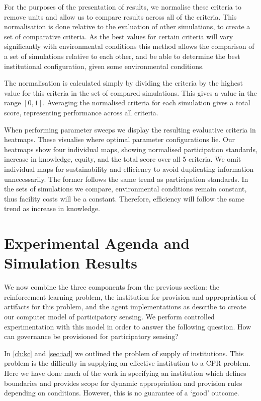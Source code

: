 For the purposes of the presentation of results, we normalise these criteria
to remove units and allow us to compare results across all of the criteria.
This normalisation is done relative to the evaluation of other simulations, to
create a set of comparative criteria. As the best values for certain criteria
will vary significantly with environmental conditions this method allows the
comparison of a set of simulations relative to each other, and be able to
determine the best institutional configuration, given some environmental
conditions.

The normalisation is calculated simply by dividing the criteria by the highest
value for this criteria in the set of compared simulations. This gives a value
in the range $[0,1]$. Averaging the normalised criteria for each simulation
gives a total score, representing performance across all criteria. 

When performing parameter sweeps we display the resulting evaluative criteria
in heatmaps. These visualise where optimal parameter configurations lie. Our
heatmaps show four individual maps, showing normalised participation
standards, increase in knowledge, equity, and the total score over all 5
criteria. We omit individual maps for sustainability and efficiency to avoid
duplicating information unnecessarily. The former follows the same trend as
participation standards. In the sets of simulations we compare, environmental
conditions remain constant, thus facility costs will be a constant. Therefore,
efficiency will follow the same trend as increase in knowledge.

\section{Experimental Agenda and Simulation Results}

We now combine the three components from the previous section: the reinforcement learning problem, the institution for provision and
appropriation of artifacts for this problem, and the agent implementations as
describe to create our computer model of participatory sensing. We perform
controlled experimentation with this model in order to answer the following question.
How can governance be provisioned for participatory sensing?

In \autoref{ch:kc} and \autoref{sec:iad} we outlined the problem of supply of
institutions. This problem is the difficulty in supplying an effective institution to
a \ac{CPR} problem. Here we have done much of the work in specifying an
institution which defines boundaries and provides scope for dynamic
appropriation and provision rules depending on conditions. However, this is no
guarantee of a `good' outcome. 

